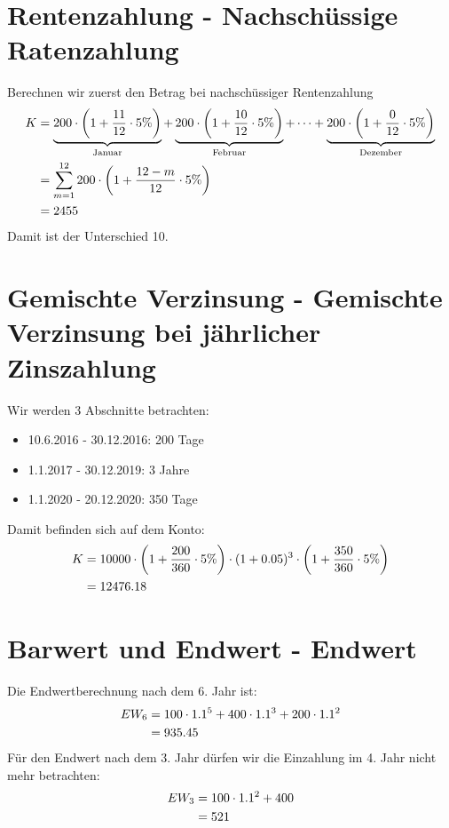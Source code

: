 \documentclass{article}
\begin{document}
	\section*{Rentenzahlung - Nachschüssige Ratenzahlung}
	Berechnen wir zuerst den Betrag bei nachschüssiger Rentenzahlung
	\begin{align}
		K &= \underbrace{200\cdot \left(1+\frac{11}{12}\cdot 5\%\right)}_{\text{Januar}} + \underbrace{200\cdot \left(1+\frac{10}{12}\cdot 5\%\right)}_{\text{Februar}} + \dots + \underbrace{200\cdot \left(1+\frac{0}{12}\cdot 5\%\right)}_{\text{Dezember}} \notag \\
		&= \sum_{m=1}^{12} 200\cdot\left(1+\frac{12-m}{12}\cdot 5\%\right) \notag \\
		&= 2455 \notag
	\end{align}
	Damit ist der Unterschied 10.
	
	\section*{Gemischte Verzinsung - Gemischte Verzinsung bei jährlicher Zinszahlung}
	Wir werden 3 Abschnitte betrachten:
	\begin{itemize}
		\item 10.6.2016 - 30.12.2016: 200 Tage
		\item 1.1.2017 - 30.12.2019: 3 Jahre
		\item 1.1.2020 - 20.12.2020: 350 Tage
	\end{itemize}
	Damit befinden sich auf dem Konto:
	\begin{align}
		K &= 10000\cdot \left(1+\frac{200}{360}\cdot 5\%\right) \cdot (1+0.05)^3 \cdot \left(1+\frac{350}{360}\cdot 5\%\right) \notag \\
		&= 12476.18 \notag
	\end{align}
	
	\section*{Barwert und Endwert - Endwert}
	Die Endwertberechnung nach dem 6. Jahr ist:
	\begin{align}
		EW_6 &= 100\cdot 1.1^5 + 400 \cdot 1.1^3 + 200\cdot 1.1^2 \notag \\
		&= 935.45 \notag
	\end{align}
	Für den Endwert nach dem 3. Jahr dürfen wir die Einzahlung im 4. Jahr nicht mehr betrachten:
	\begin{align}
		EW_3 &= 100\cdot1.1^2 + 400 \notag \\
		&= 521 \notag
	\end{align}
\end{document}

